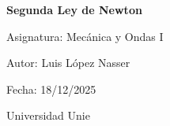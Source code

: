 \documentclass[12pt,a4paper]{article}
\begin{document}
\begin{titlepage}
  \centering
  \vspace*{2cm}
  {\LARGE \textbf{Segunda Ley de Newton}\par}
  \vspace{1cm}
  {\large Asignatura: Mecánica y Ondas I\par}
  \vspace{0.5cm}
  {\large Autor: Luis López Nasser\par}
  {\large Fecha: 18/12/2025\par}
  \vfill
  {\large Universidad Unie\par}
\end{titlepage}

\tableofcontents
\clearpage
\end{document}
